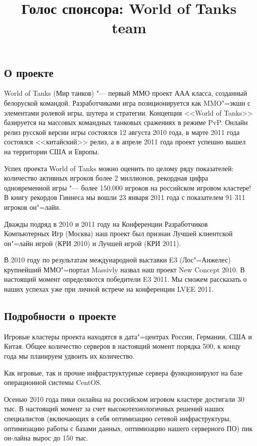 \documentclass[10pt, a5paper]{article}
\begin{document}
\title{Голос спонсора: World of Tanks team}
\date{}
\maketitle

\subsection*{О проекте}

World of Tanks (Мир танков) "--- первый ММО проект ААА класса, созданный
белоруской командой. Разработчиками игра позиционируется как MMO"=экшн с
элементами ролевой игры, шутера и стратегии. Концепция <<World of Tanks>>
базируется на массовых командных танковых сражениях в режиме PvP. Онлайн
релиз русской версии игры состоялся 12 августа 2010 года, в марте 2011 года
состоялся <<китайский>> релиз, а в апреле 2011 года проект успешно вышел на
территории США и Европы.

Успех проекта World of Tanks можно оценить по целому ряду показателей:
количество активных игроков более 2 миллионов, рекордная цифра одновременной
игры "--- более 150.000 игроков на российском игровом кластере! В книгу
рекордов Гиннеса мы вошли 23 января 2011 года с показателем 91 311 игроков
он"=лайн. 

Дважды подряд в 2010 и 2011 году на Конференции Разработчиков Компьютерных
Игр (Москва) наш проект был признан Лучшей клиентской он"=лайн игрой (КРИ
2010) и Лучшей игрой (КРИ 2011).

В 2010 году по результатам международной выставки E3 (Лос"=Анжелес)
крупнейший ММО"=портал Massivly назвал наш проект New Concept 2010. В
настоящий момент определяются победители E3 2011. Мы сможем рассказать о
наших успехах уже при личной встрече на конференции LVEE 2011.

\subsection*{Подробности о проекте}

Игровые кластеры проекта находятся в дата"=центрах России, Германии, США и
Китая. Общее количество серверов в настоящий момент порядка 500, к концу
года мы планируем удвоить их количество.

Как игровые, так и прочие инфраструктурные сервера функционируют на базе
операционной системы CentOS.

Осенью 2010 года пики онлайна на российском игровом кластере достигали 30
тыс. В настоящий момент за счет высокотехнологичных решений наших
специалистов (включающих в себя оптимизацию сетевой инфраструктуры,
оптимизацию работы с базами данных, оптимизацию нашего серверного ПО) пик
он-лайна вырос до 150 тыс.
\end{document}
